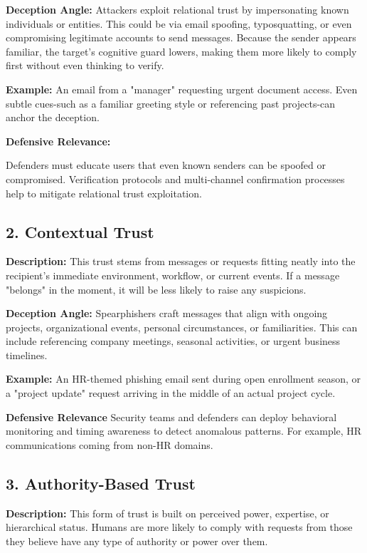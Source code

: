 \textbf{Deception Angle:} Attackers exploit relational trust by impersonating known individuals or entities. This could be via email spoofing, typosquatting, or even compromising legitimate accounts to send messages. Because the sender appears familiar, the target's cognitive guard lowers, making them more likely to comply first without even thinking to verify.

\textbf{Example:} An email from a "manager" requesting urgent document access. Even subtle cues-such as a familiar greeting style or referencing past projects-can anchor the deception.

\begin{svgraybox}
\textbf{Defensive Relevance:}

Defenders must educate users that even known senders can be spoofed or compromised. Verification protocols and multi-channel confirmation processes help to mitigate relational trust exploitation.
\end{svgraybox}

\subsection{2. Contextual Trust}
\textbf{Description:} This trust stems from messages or requests fitting neatly into the recipient's immediate environment, workflow, or current events. If a message "belongs" in the moment, it will be less likely to raise any suspicions.

\textbf{Deception Angle:} Spearphishers craft messages that align with ongoing projects, organizational events, personal circumstances, or familiarities. This can include referencing company meetings, seasonal activities, or urgent business timelines.

\textbf{Example:} An HR-themed phishing email sent during open enrollment season, or a "project update" request arriving in the middle of an actual project cycle.

\begin{svgraybox}
\textbf{Defensive Relevance}
Security teams and defenders can deploy behavioral monitoring and timing awareness to detect anomalous patterns. For example, HR communications coming from non-HR domains.
\end{svgraybox}

\subsection{3. Authority-Based Trust}
\textbf{Description:} This form of trust is built on perceived power, expertise, or hierarchical status. Humans are more likely to comply with requests from those they believe have any type of authority or power over them.

